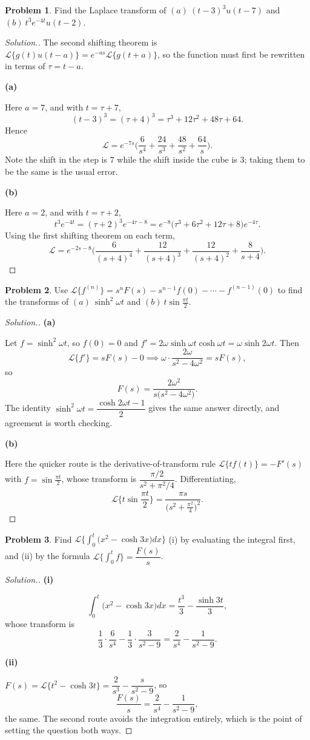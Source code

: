 \documentclass[11pt,a4paper]{article}
\theoremstyle{definition}
\newtheorem{problemx}{Problem}[subsection]
\newenvironment{problem}{\begin{problemx}}{\end{problemx}}
\newenvironment{solution}
  {\renewcommand{\qedsymbol}{}\begin{proof}[\textit{Solution}.]}
  {\end{proof}}
\newcommand{\subhead}[1]{%
  \par\medskip\noindent\textbf{#1}\par\nobreak\smallskip}
\begin{document}
\begin{problem}
Find the Laplace transform of
$(a)\ (t-3)^3u(t-7)$ and $(b)\ t^3e^{-4t}u(t-2)$.
\end{problem}
\begin{solution}
The second shifting theorem is
$\mathcal{L}\{g(t)u(t-a)\} = e^{-as}\mathcal{L}\{g(t+a)\}$, so the function must
first be rewritten in terms of $\tau = t-a$.

\subhead{(a)}
Here $a=7$, and with $t = \tau+7$,
$$(t-3)^3 = (\tau+4)^3 = \tau^3+12\tau^2+48\tau+64 .$$
Hence
$$\mathcal{L} = e^{-7s}\Big(\frac{6}{s^4} + \frac{24}{s^3}
+ \frac{48}{s^2} + \frac{64}{s}\Big).$$
Note the shift in the step is $7$ while the shift inside the cube is $3$; taking
them to be the same is the usual error.

\subhead{(b)}
Here $a=2$, and with $t = \tau+2$,
$$t^3e^{-4t} = (\tau+2)^3e^{-4\tau-8}
= e^{-8}\big(\tau^3+6\tau^2+12\tau+8\big)e^{-4\tau}.$$
Using the first shifting theorem on each term,
$$\mathcal{L} = e^{-2s-8}\Big(\frac{6}{(s+4)^4} + \frac{12}{(s+4)^3}
+ \frac{12}{(s+4)^2} + \frac{8}{s+4}\Big).$$
\end{solution}

\begin{problem}
Use $\mathcal{L}\{f^{(n)}\} = s^nF(s)-s^{n-1}f(0)-\cdots-f^{(n-1)}(0)$ to find
the transforms of $(a)\ \sinh^2\omega t$ and $(b)\ t\sin\frac{\pi t}{2}$.
\end{problem}
\begin{solution}
\subhead{(a)}
Let $f = \sinh^2\omega t$, so $f(0)=0$ and
$f' = 2\omega\sinh\omega t\cosh\omega t = \omega\sinh 2\omega t$. Then
$$\mathcal{L}\{f'\} = sF(s) - 0
\implies \omega\cdot\frac{2\omega}{s^2-4\omega^2} = sF(s),$$
so
$$F(s) = \frac{2\omega^2}{s\big(s^2-4\omega^2\big)}.$$
The identity $\sinh^2\omega t = \dfrac{\cosh 2\omega t-1}{2}$ gives the same
answer directly, and agreement is worth checking.

\subhead{(b)}
Here the quicker route is the derivative-of-transform rule
$\mathcal{L}\{tf(t)\} = -F'(s)$ with $f = \sin\frac{\pi t}{2}$, whose transform
is $\dfrac{\pi/2}{s^2+\pi^2/4}$. Differentiating,
$$\mathcal{L}\Big\{t\sin\frac{\pi t}{2}\Big\}
= \frac{\pi s}{\big(s^2+\frac{\pi^2}{4}\big)^2}.$$
\end{solution}

\begin{problem}
Find $\displaystyle{\mathcal{L}\Big\{\int_0^t\big(x^2-\cosh 3x\big)dx\Big\}}$
(i) by evaluating the integral first, and (ii) by the formula
$\mathcal{L}\big\{\int_0^tf\big\} = \dfrac{F(s)}{s}$.
\end{problem}
\begin{solution}
\subhead{(i)}
$$\int_0^t\big(x^2-\cosh 3x\big)dx = \frac{t^3}{3} - \frac{\sinh 3t}{3},$$
whose transform is
$$\frac13\cdot\frac{6}{s^4} - \frac13\cdot\frac{3}{s^2-9}
= \frac{2}{s^4} - \frac{1}{s^2-9}.$$

\subhead{(ii)}
$F(s) = \mathcal{L}\{t^2-\cosh 3t\} = \dfrac{2}{s^3} - \dfrac{s}{s^2-9}$, so
$$\frac{F(s)}{s} = \frac{2}{s^4} - \frac{1}{s^2-9},$$
the same. The second route avoids the integration entirely, which is the point
of setting the question both ways.
\end{solution}
\end{document}

